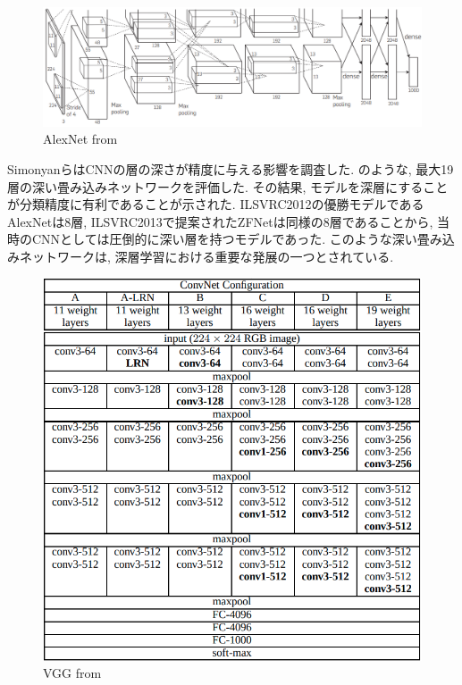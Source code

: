 \begin{figure}[hbtp]
  \centering
 \includegraphics[keepaspectratio, scale=0.35]
      {images/Alexnet.png}
 \caption{AlexNet from \cite{AlexNet}}
 \label{Fig:AlexNet}
\end{figure}
\newpage
Simonyan\cite{simonyan}らはCNNの層の深さが精度に与える影響を調査した. のような, 最大19層の深い畳み込みネットワークを評価した. その結果, モデルを深層にすることが分類精度に有利であることが示された.
ILSVRC2012の優勝モデルであるAlexNetは8層, ILSVRC2013で提案されたZFNetは同様の8層であることから, 当時のCNNとしては圧倒的に深い層を持つモデルであった. このような深い畳み込みネットワークは, 深層学習における重要な発展の一つとされている.
\begin{figure}[hbtp]
  \centering
 \includegraphics[keepaspectratio, scale=0.5]
      {images/VGG2.png}
 \caption{VGG from \cite{AlexNet}}
 \label{Fig:VGG}
\end{figure}




\newpage
